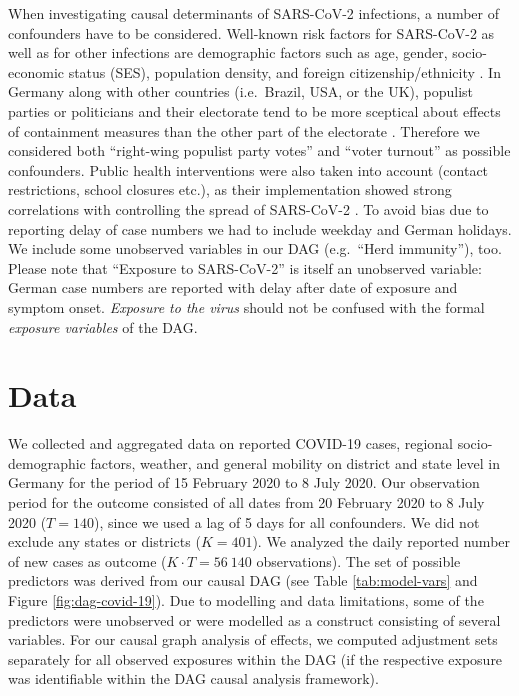 \documentclass[]{elsarticle} %
\begin{document}
When investigating causal determinants of SARS-CoV-2 infections, a number of confounders have to be considered. Well-known risk factors for SARS-CoV-2 as well as for other infections are demographic factors such as age, gender, socio-economic status (SES), population density, and foreign citizenship/ethnicity \citep{de2020risk, Dragano2020.06.17.20133918, jhucovid19db2020}. In Germany along with other countries (i.e.~Brazil, USA, or the UK), populist parties or politicians and their electorate tend to be more sceptical about effects of containment measures than the other part of the electorate \citep{dohle_wingen_schreiber_2020, engle_staying_2020}. Therefore we considered both ``right-wing populist party votes'' and ``voter turnout'' as possible confounders. Public health interventions were also taken into account (contact restrictions, school closures etc.), as their implementation showed strong correlations with controlling the spread of SARS-CoV-2 \citep{cowling2020impact, juni_impact_2020, lai_effect_2020}. To avoid bias due to reporting delay of case numbers we had to include weekday and German holidays. We include some unobserved variables in our DAG (e.g.~``Herd immunity''), too. Please note that ``Exposure to SARS-CoV-2'' is itself an unobserved variable: German case numbers are reported with delay after date of exposure and symptom onset. \emph{Exposure to the virus} should not be confused with the formal \emph{exposure variables} of the DAG.

\hypertarget{data}{%
\section{Data}\label{data}}

We collected and aggregated data on reported COVID-19 cases, regional socio-demographic factors, weather, and general mobility on district and state level in Germany for the period of 15 February 2020 to 8 July 2020. Our observation period for the outcome consisted of all dates from 20 February 2020 to 8 July 2020 (\(T=140\)), since we used a lag of 5 days for all confounders. We did not exclude any states or districts (\(K=401\)). We analyzed the daily reported number of new cases as outcome (\(K\cdot T=56{\ }140\) observations). The set of possible predictors was derived from our causal DAG (see Table \ref{tab:model-vars} and Figure \ref{fig:dag-covid-19}). Due to modelling and data limitations, some of the predictors were unobserved or were modelled as a construct consisting of several variables. For our causal graph analysis of effects, we computed adjustment sets separately for all observed exposures within the DAG (if the respective exposure was identifiable within the DAG causal analysis framework).
\end{document}
